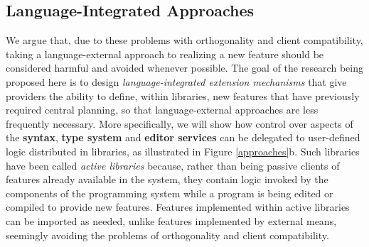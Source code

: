 \subsection{Language-Integrated Approaches}\label{language-integrated-approaches}
We argue that, due to these problems with orthogonality and client compatibility, taking a language-external approach to realizing a new feature should be considered harmful and avoided whenever possible. The goal of the research being proposed here is to design \emph{language-integrated extension mechanisms} that give providers the ability to define, within libraries, new features that have previously required central planning, 
so that language-external approaches are less frequently necessary. More specifically, we will show how control over aspects of the \textbf{syntax}, \textbf{type system} and \textbf{editor services} can be delegated to user-defined logic distributed in {libraries}, as illustrated in Figure \ref{approaches}b. 
Such libraries have been called \emph{active libraries}  \cite{activelibraries} because, rather than being passive clients of features already available in the system, they contain logic invoked by the components of the programming system while a program is being edited or compiled to provide new features. Features implemented within active libraries can be imported as needed, unlike features implemented by external means, seemingly avoiding the problems of orthogonality and client compatibility.

